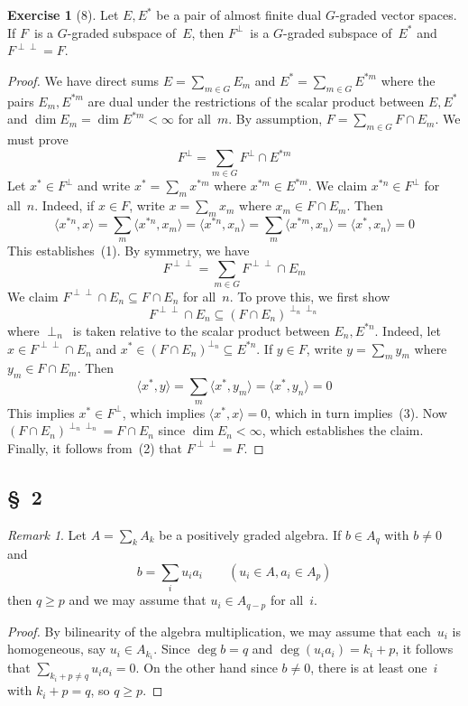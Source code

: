 \documentclass[letterpaper,12pt]{article}
\newcommand{\sect}{\cap}
\newcommand{\sprod}[2]{\langle#1,#2\rangle}
\newcommand{\oc}[1]{#1^{\perp}}
\newcommand{\occ}[1]{#1^{\perp\perp}}
\theoremstyle{definition}
\newtheorem*{exer}{Exercise}
\theoremstyle{remark}
\newtheorem*{rmk}{Remark}
\begin{document}
\begin{exer}[8]
Let \(E,E^*\) be a pair of almost finite dual \(G\)-graded vector spaces. If \(F\)~is a \(G\)-graded subspace of~\(E\), then \(\oc{F}\)~is a \(G\)-graded subspace of~\(E^*\) and \(\occ{F}=F\).
\end{exer}
\begin{proof}
We have direct sums \(E=\sum_{m\in G}E_m\) and \(E^*=\sum_{m\in G}E^{*m}\) where the pairs \(E_m,E^{*m}\) are dual under the restrictions of the scalar product between \(E,E^*\) and \(\dim E_m=\dim E^{*m}<\infty\) for all~\(m\). By assumption, \(F=\sum_{m\in G}F\sect E_m\).
We must prove
\[\oc{F}=\sum_{m\in G}\oc{F}\sect E^{*m}\tag{1}\]
Let \(x^*\in\oc{F}\) and write \(x^*=\sum_m x^{*m}\) where \(x^{*m}\in E^{*m}\). We claim \(x^{*n}\in\oc{F}\) for all~\(n\). Indeed, if \(x\in F\), write \(x=\sum_m x_m\) where \(x_m\in F\sect E_m\). Then
\[\sprod{x^{*n}}{x}=\sum_m\sprod{x^{*n}}{x_m}=\sprod{x^{*n}}{x_n}=\sum_m\sprod{x^{*m}}{x_n}=\sprod{x^*}{x_n}=0\]
This establishes~(1). By symmetry, we have
\[\occ{F}=\sum_{m\in G}\occ{F}\sect E_m\tag{2}\]
We claim \(\occ{F}\sect E_n\subseteq F\sect E_n\) for all~\(n\). To prove this, we first show
\[\occ{F}\sect E_n\subseteq(F\sect E_n)^{\perp_n\perp_n}\tag{3}\]
where \(\perp_n\)~is taken relative to the scalar product between \(E_n,E^{*n}\). Indeed, let \(x\in\occ{F}\sect E_n\) and \(x^*\in(F\sect E_n)^{\perp_n}\subseteq E^{*n}\). If \(y\in F\), write \(y=\sum_m y_m\) where \(y_m\in F\sect E_m\). Then
\[\sprod{x^*}{y}=\sum_m\sprod{x^*}{y_m}=\sprod{x^*}{y_n}=0\]
This implies \(x^*\in\oc{F}\), which implies \(\sprod{x^*}{x}=0\), which in turn implies~(3). Now \((F\sect E_n)^{\perp_n\perp_n}=F\sect E_n\) since \(\dim E_n<\infty\), which establishes the claim. Finally, it follows from~(2) that \(\occ{F}=F\).
\end{proof}

\subsection*{\S~2}
\begin{rmk}
Let \(A=\sum_k A_k\) be a positively graded algebra. If \(b\in A_q\) with \(b\ne 0\) and
\[b=\sum_i u_ia_i\qquad(u_i\in A,a_i\in A_p)\]
then \(q\ge p\) and we may assume that \(u_i\in A_{q-p}\) for all~\(i\).
\end{rmk}
\begin{proof}
By bilinearity of the algebra multiplication, we may assume that each~\(u_i\) is homogeneous, say \(u_i\in A_{k_i}\). Since \(\deg b=q\) and \(\deg(u_ia_i)=k_i+p\), it follows that \(\sum_{k_i+p\ne q}u_ia_i=0\). On the other hand since \(b\ne 0\), there is at least one~\(i\) with \(k_i+p=q\), so \(q\ge p\).
\end{proof}
\end{document}
